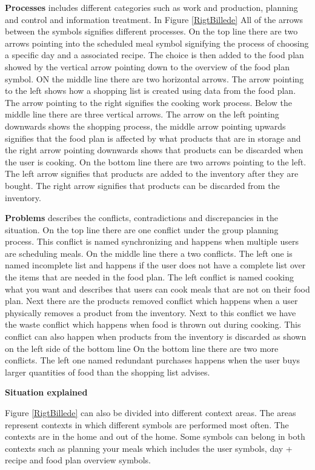 \textbf{Processes} includes different categories such as work and production, planning and control and information treatment. In Figure \ref{RigtBillede} All of the arrows between the symbols signifies different processes. On the top line there are two arrows pointing into the scheduled meal symbol signifying the process of choosing a specific day and a associated recipe. The choice is then added to the food plan showed by the vertical arrow pointing down to the overview of the food plan symbol. ON the middle line there are two horizontal arrows. The arrow pointing to the left shows how a shopping list is created using data from the food plan. The arrow pointing to the right signifies the cooking work process. Below the middle line there are three vertical arrows. The arrow on the left pointing downwards shows the shopping process, the middle arrow pointing upwards signifies that the food plan is affected by what products that are in storage and the right arrow pointing downwards shows that products can be discarded when the user is cooking. On the bottom line there are two arrows pointing to the left. The left arrow signifies that products are added to the inventory after they are bought. The right arrow signifies that products can be discarded from the inventory.            

\textbf{Problems} describes the conflicts, contradictions and discrepancies in the situation. On the top line there are one conflict under the group planning process. This conflict is named synchronizing and happens when multiple users are scheduling meals. On the middle line there a two conflicts. The left one is named incomplete list and happens if the user does not have a complete list over the items that are needed in the food plan. The left conflict is named cooking what you want and describes that users can cook meals that are not on their food plan. Next there are the products removed conflict which happens when a user physically removes a product from the inventory. Next to this conflict we have the waste conflict which happens when food is thrown out during cooking. This conflict can also happen when products from the inventory is discarded as shown on the left side of the bottom line On the bottom line there are two more conflicts. The left one named redundant purchases happens when the user buys larger quantities of food than the shopping list advises.             

\textbf{Situation explained}

Figure \ref{RigtBillede} can also be divided into different context areas. The areas represent contexts in which different symbols are performed most often. The contexts are in the home and out of the home. Some symbols can belong in both contexts such as planning your meals which includes the user symbols, day + recipe and food plan overview symbols.       
